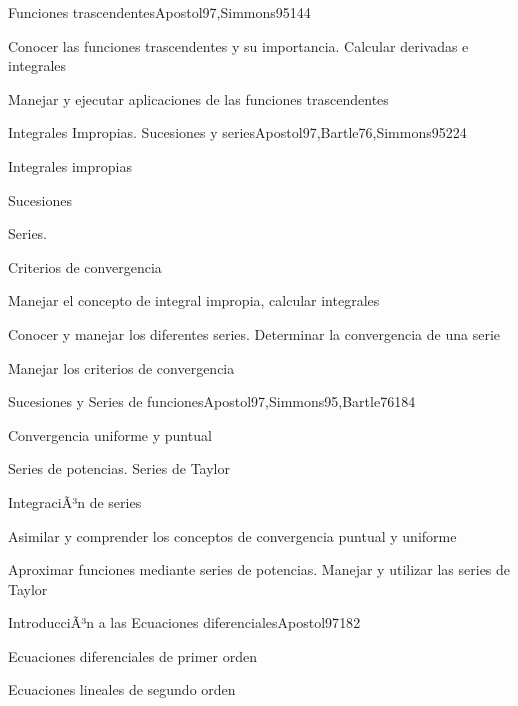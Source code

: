 \begin{syllabus}
\begin{unit}{Funciones trascendentes}{Apostol97,Simmons95}{14}{4}
   \begin{unitgoals}
      \item Conocer las funciones trascendentes y su importancia. Calcular derivadas e integrales
      \item Manejar y ejecutar aplicaciones de las funciones trascendentes
      \end{unitgoals}
\end{unit}

\begin{unit}{Integrales Impropias. Sucesiones y series}{Apostol97,Bartle76,Simmons95}{22}{4}
   \begin{topics}
      \item Integrales impropias
      \item Sucesiones
      \item Series.
      \item Criterios de convergencia
   \end{topics}

   \begin{unitgoals}
      \item Manejar el concepto de integral impropia, calcular integrales
      \item Conocer y manejar los diferentes series. Determinar la convergencia de una serie
      \item Manejar los criterios de convergencia
      \end{unitgoals}
\end{unit}

\begin{unit}{Sucesiones y Series de funciones}{Apostol97,Simmons95,Bartle76}{18}{4}
   \begin{topics}
      \item Convergencia uniforme y puntual
      \item Series de potencias. Series de Taylor
      \item IntegraciÃ³n de series
   \end{topics}

   \begin{unitgoals}
      \item Asimilar y comprender los conceptos de convergencia puntual y uniforme
      \item Aproximar funciones mediante series de potencias. Manejar y utilizar las series de Taylor
      \end{unitgoals}
\end{unit}

\begin{unit}{IntroducciÃ³n a las Ecuaciones diferenciales}{Apostol97}{18}{2}
   \begin{topics}
      \item Ecuaciones diferenciales de primer orden
      \item Ecuaciones lineales de segundo orden
   \end{topics}


\end{unit}
\end{syllabus}
